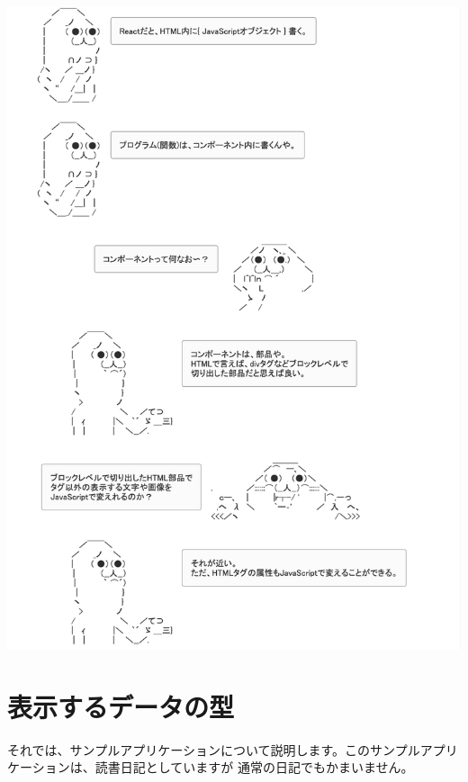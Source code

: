 \begin{reviewimage}[H]%
\includegraphics[width=0.9\maxwidth]{./images/03-todo-with-react/jsx02.png}%
\label{image:03-todo-with-react:jsx02}
\end{reviewimage}

\clearpage


\section{表示するデータの型}
\keeplastskip{
  \label{sec:3-2}
  \label{sec-032UIDataType}
  \par\nobreak
}

それでは、サンプルアプリケーションについて説明します。このサンプルアプリケーションは、読書日記としていますが
通常の日記でもかまいません。

